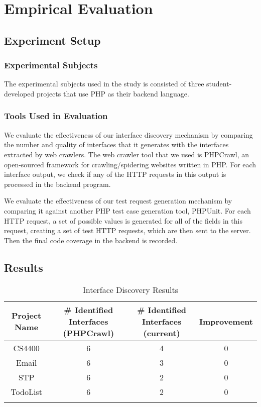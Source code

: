 \chapter{Empirical Evaluation}

\section{Experiment Setup}
\subsection{Experimental Subjects}
The experimental subjects used in the study is consisted of three student-developed projects that use PHP as their backend language.

\subsection{Tools Used in Evaluation}
We evaluate the effectiveness of our interface discovery mechanism by comparing the number and quality of interfaces that it generates with the interfaces extracted by web crawlers. The web crawler tool that we used is PHPCrawl, an open-sourced framework for crawling/spidering websites written in PHP. For each interface output, we check if any of the HTTP requests in this output is processed in the backend program.

We evaluate the effectiveness of our test request generation mechanism by comparing it against another PHP test case generation tool, PHPUnit. For each HTTP request, a set of possible values is generated for all of the fields in this request, creating a set of test HTTP requests, which are then sent to the server. Then the final code coverage in the backend is recorded.

\section{Results}
\begin{table}
\caption{Interface Discovery Results}
\begin{center}
\begin{tabular}{cccc}
Project Name & \# Identified Interfaces (PHPCrawl) & \# Identified Interfaces (current) & Improvement \\
\hline
CS4400 & 6 & 4 & 0 \\
Email & 6 & 3 & 0 \\
STP & 6 & 2 & 0 \\
TodoList & 6 & 2 & 0 \\
\label{Interface Discovery Results}
\end{tabular}
\end{center}
\end{table}

\blindtext
